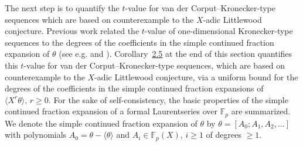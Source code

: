 \documentclass[10pt,a4paper]{amsart}
\newcommand{\ZZ}{\mathbb Z}
\newcommand{\RR}{\mathbb R}
\newcommand{\FF}{\mathbb{F}}
\renewcommand{\(}{\left (}
\renewcommand{\)}{\right )}
\theoremstyle{definition}
\numberwithin{equation}{section}
\begin{document}
The next step is to quantify the $t$-value for van der Corput--Kronecker-type sequences which are based on counterexample to the $X$-adic Littlewood conjecture. Previous work related the $t$-value of one-dimensional Kronecker-type sequences to the degrees of the coefficients in the simple continued fraction expansion of $\theta$ (see e.g. \cite{LarNie1993} and \cite{HoferdigKH}). Corollary~\href{https://arxiv.org/abs/2501.11362v2}{2.5} at the end of this section quantifies this $t$-value for van der Corput--Kronecker-type sequences, which are based on counterexample to the $X$-adic Littlewood conjecture, via a uniform bound for the degrees of the coefficients in the simple continued fraction expansions of $\langle X^r\theta\rangle,\,r\geq 0$. 
For the sake of self-consistency, the basic properties of the simple continued fraction expansion of a formal Laurentseries over $\FF_p$ are summarized. We denote the simple continued fraction expansion of $\theta$ by $\theta=[A_0;A_1,A_2,\ldots]$ with polynomials $A_0=\theta-\langle\theta \rangle$ and $A_i\in\FF_p(X),\,i\geq 1$ of degrees $\geq 1$. %
\end{document}
